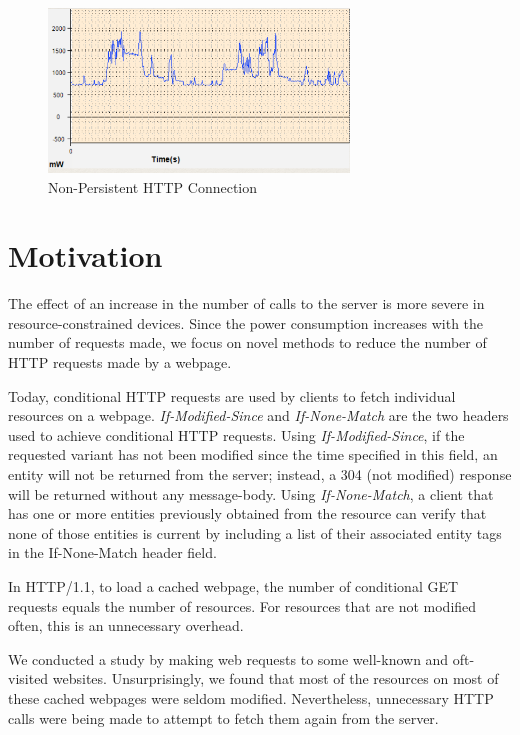 \documentclass{sigplanconf}
\begin{document}
\begin{figure}[ht!]
\centering
\includegraphics[width=80mm]{powerconsumption2.png}
\caption{Non-Persistent HTTP Connection }
\label{fig:sp_gd_mnist}
\end{figure}

\section{Motivation}
The effect of an increase in the number of calls to the server is more severe in resource-constrained devices. Since the power consumption increases with the number of requests made, we focus on novel methods to reduce the number of HTTP requests made by a webpage.

Today, conditional HTTP requests are used by clients to fetch individual resources on a webpage.  {\it If-Modified-Since} and {\it If-None-Match} are the two headers used to achieve conditional HTTP requests. Using {\it If-Modified-Since}, if the requested variant has not been modified since the time specified in this field, an entity will not be returned from the server; instead, a 304 (not modified) response will be returned without any message-body. Using {\it If-None-Match}, a client that has one or more entities previously obtained from the resource can verify that none of those entities is current by including a list of their associated entity tags in the If-None-Match header field.

In HTTP/1.1, to load a cached webpage, the number of conditional GET requests equals the number of resources. For resources that are not modified often, this is an unnecessary overhead.

We conducted a study by making web requests to some well-known and oft-visited websites. Unsurprisingly, we found that most of the resources on most of these cached webpages were seldom modified. Nevertheless, unnecessary HTTP calls were being made to attempt to fetch them again from the server.
\end{document}
